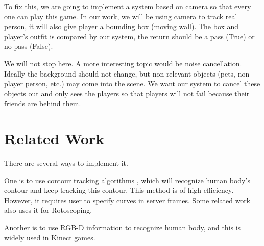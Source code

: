 \documentclass[conference,compsoc]{IEEEtran}
\begin{document}
	\par
		To fix this, we are going to implement a system based on camera so that every one can play this game.
		In our work, we will be using camera to track real person, it will also give player a bounding box (moving wall).
		The box and player's outfit is compared by our system, the return should be a pass (True) or no pass (False).
	\par
		We will not stop here.
		A more interesting topic would be noise cancellation.
		Ideally the background should not change, but non-relevant objects (pets, non-player person, etc.) may come into the scene.
		We want our system to cancel these objects out and only sees the players so that players will not fail because their friends are behind them.
	\par
\section{Related Work}
	\par
		There are several ways to implement it.
	\par
		One is to use contour tracking algorithms \cite{panin2006efficient}, which will recognize human body's contour and keep tracking this contour. This method is of high efficiency. However, it requires user to specify curves in server frames. Some related work also uses it for Rotoscoping\cite{agarwala2004keyframe}.
	\par
		Another is to use RGB-D information to recognize human body, and this is widely used in Kinect games\cite{buys2014adaptable}.
	\par
\end{document}
